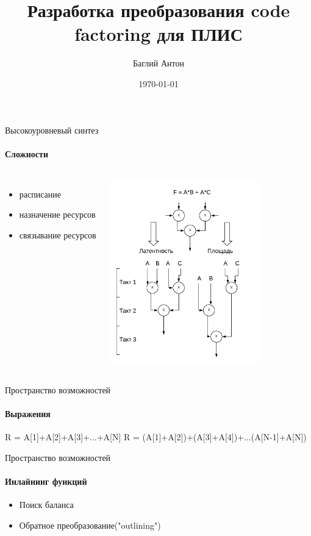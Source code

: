 \documentclass{beamer}              %
\title{Разработка преобразования code factoring для ПЛИС}
\subtitle{}
\date{\today}
\author{Баглий Антон}
\institute{\url{sfedu.ru}}
\begin{document}
\maketitle




\begin{frame}{Высокоуровневый синтез}
  \framesubtitle{Сложности}
  
  \begin{columns}
      \begin{itemize}
         \item расписание
          \item назначение ресурсов
          \item связывание ресурсов
  		\end{itemize}

      \begin{block}{}
         \includegraphics[height=8cm]{img/HLSCompromise.png}
      \end{block}
  \end{columns}	
  
  
\end{frame}

\begin{frame}{Пространство возможностей}
  \framesubtitle{Выражения}
  R = A[1]+A[2]+A[3]+...+A[N]
  R = (A[1]+A[2])+(A[3]+A[4])+...(A[N-1]+A[N])
\end{frame}

\begin{frame}{Пространство возможностей}
  \framesubtitle{Инлайнинг функций}
  \begin{itemize}
      \item Поиск баланса
      \item Обратное преобразование("outlining")
  \end{itemize}
  
\end{frame}
\end{document}
